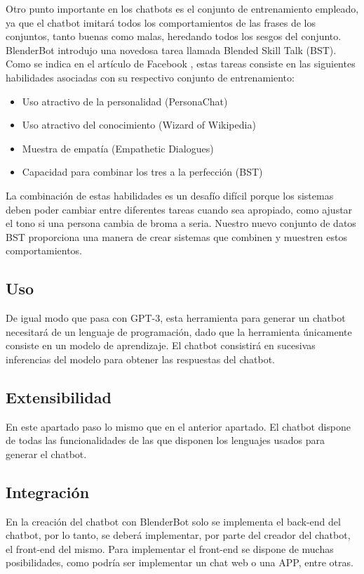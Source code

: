 Otro punto importante en los chatbots es el conjunto de entrenamiento empleado, ya que el chatbot imitará todos los comportamientos de las frases de los conjuntos, tanto buenas como malas, heredando todos los sesgos del conjunto. BlenderBot introdujo una novedosa tarea llamada Blended Skill Talk (BST). Como se indica en el artículo de Facebook \cite{RefWorks:RefID:41-roller2020recipes}, estas tareas consiste en las siguientes habilidades asociadas con su respectivo conjunto de entrenamiento:

\begin{itemize}
\item Uso atractivo de la personalidad (PersonaChat)
\item Uso atractivo del conocimiento (Wizard of Wikipedia)
\item Muestra de empatía (Empathetic Dialogues)
\item Capacidad para combinar los tres a la perfección (BST)
\end{itemize}

La combinación de estas habilidades es un desafío difícil porque los sistemas deben poder cambiar entre diferentes tareas cuando sea apropiado, como ajustar el tono si una persona cambia de broma a seria. Nuestro nuevo conjunto de datos BST proporciona una manera de crear sistemas que combinen y muestren estos comportamientos.

\subsection*{Uso}

De igual modo que pasa con GPT-3, esta herramienta para generar un chatbot necesitará de un lenguaje de programación, dado que la herramienta únicamente consiste en un modelo de aprendizaje. El chatbot consistirá en sucesivas inferencias del modelo para obtener las respuestas del chatbot.

\subsection*{Extensibilidad}

En este apartado paso lo mismo que en el anterior apartado. El chatbot dispone de todas las funcionalidades de las que disponen los lenguajes usados para generar el chatbot.

\subsection*{Integración}

En la creación del chatbot con BlenderBot solo se implementa el \gls{back-end} del chatbot, por lo tanto, se deberá implementar, por parte del creador del chatbot, el \gls{front-end} del mismo. Para implementar el \gls{front-end} se dispone de muchas posibilidades, como podría ser implementar un chat web o una APP, entre otras.

